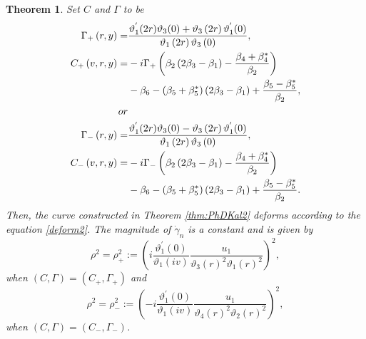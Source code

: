 \documentclass[10pt,leqno]{amsart}
\newtheorem{theorem}{Theorem}[section]
\numberwithin{equation}{section}
\begin{document}
\begin{theorem}\label{thm:CGamma}
Set $C$ and $\Gamma$ to be
\begin{equation}\label{CGamma}
\begin{split}
\Gamma_{+}\left(r,y\right)=&\frac{\vartheta_{1}^{'}(2r)\vartheta_{3}(0)+ \vartheta_{3}\left(2r\right)\vartheta_{1}^{'}(0)}{\vartheta_{1}\left(2r\right)\vartheta_{3}\left(0\right)},\\
C_{+}\left(v,r,y\right)=&-i\Gamma_{+}\left(\beta_{2}\left(2\beta_{3}-\beta_{1}\right)-\frac{\beta_{4}+\beta_{4}^{*}}{\beta_{2}}\right)\\
&-\beta_{6}-\left(\beta_{5}+\beta_{5}^{*}\right)\left(2\beta_{3}-\beta_{1}\right)+\frac{\beta_{5}-\beta_{5}^{*}}{\beta_{2}},\\
\rm or\\
\Gamma_{-}\left(r,y\right)=&\frac{\vartheta_{1}^{'}(2r)\vartheta_{3}(0)- \vartheta_{3}\left(2r\right)\vartheta_{1}^{'}(0)}{\vartheta_{1}\left(2r\right)\vartheta_{3}\left(0\right)},\\
C_{-}\left(v,r,y\right)=&-i\Gamma_{-}\left(\beta_{2}\left(2\beta_{3}-\beta_{1}\right)-\frac{\beta_{4}+\beta_{4}^{*}}{\beta_{2}}\right)\\
&-\beta_{6}-\left(\beta_{5}+\beta_{5}^{*}\right)\left(2\beta_{3}-\beta_{1}\right)+\frac{\beta_{5}-\beta_{5}^{*}}{\beta_{2}}.
\end{split}
\end{equation}
Then, the curve constructed in Theorem \ref{thm:PhDKal2}
deforms according to the equation \eqref{deform2}.
The magnitude of $\dot{\gamma}_{n}$ is a constant and is given by
\begin{equation}\label{rhopp}
\rho^{2}=\rho_+^{2}:=\left(i\frac{\vartheta_{1}^{'}(0)}{\vartheta_{1}(iv)}\frac{u_{1}}{\vartheta_{3}(r)^{2}\vartheta_{1}(r)^{2}}\right)^{2},
\end{equation}
when $(C,\Gamma)=(C_+,\Gamma_+)$
and
\begin{equation}\label{rhopm}
\rho^{2}=\rho_-^{2}:=\left(-i\frac{\vartheta_{1}^{'}(0)}{\vartheta_{1}(iv)}\frac{u_{1}}{\vartheta_{4}(r)^{2}\vartheta_{2}(r)^{2}}\right)^{2},
\end{equation}
when $(C,\Gamma)=(C_-,\Gamma_-)$.
\end{theorem}
\end{document}
